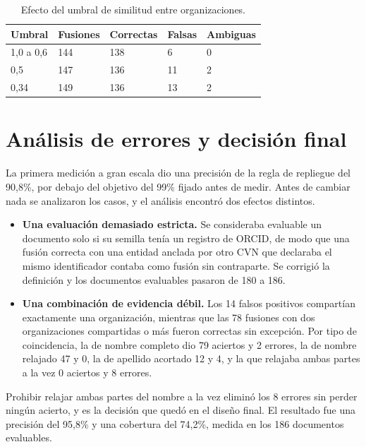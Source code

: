 \begin{table}[H]
  \centering
  \small
  \renewcommand{\arraystretch}{1.15}
  \begin{tabular}{p{} p{} p{} p{} p{}}
    \hline
    \textbf{Umbral} & \textbf{Fusiones} & \textbf{Correctas} & \textbf{Falsas} & \textbf{Ambiguas} \\
    \hline
    1,0 a 0,6 & 144 & 138 & 6 & 0 \\
    0,5 & 147 & 136 & 11 & 2 \\
    0,34 & 149 & 136 & 13 & 2 \\
    \hline
  \end{tabular}
  \caption{Efecto del umbral de similitud entre organizaciones.}
  \label{tab:anexo_umbral}
\end{table}

\section{Análisis de errores y decisión final}
\label{sec:anexo_resolucion_errores}

La primera medición a gran escala dio una precisión de la regla de repliegue
del 90,8\%, por debajo del objetivo del 99\% fijado antes de medir. Antes de
cambiar nada se analizaron los casos, y el análisis encontró dos efectos
distintos.

\begin{itemize}
  \item \textbf{Una evaluación demasiado estricta.} Se consideraba evaluable
  un documento solo si su semilla tenía un registro de ORCID, de modo que una
  fusión correcta con una entidad anclada por otro CVN que declaraba el mismo
  identificador contaba como fusión sin contraparte. Se corrigió la
  definición y los documentos evaluables pasaron de 180 a 186.
  \item \textbf{Una combinación de evidencia débil.} Los 14 falsos positivos
  compartían exactamente una organización, mientras que las 78 fusiones con dos
  organizaciones compartidas o más fueron correctas sin excepción. Por tipo
  de coincidencia, la de nombre completo dio 79 aciertos y 2 errores, la de
  nombre relajado 47 y 0, la de apellido acortado 12 y 4, y la que relajaba
  ambas partes a la vez 0 aciertos y 8 errores.
\end{itemize}

Prohibir relajar ambas partes del nombre a la vez eliminó los 8 errores sin
perder ningún acierto, y es la decisión que quedó en el diseño final. El
resultado fue una precisión del 95,8\% y una cobertura del 74,2\%, medida en
los 186 documentos evaluables.

